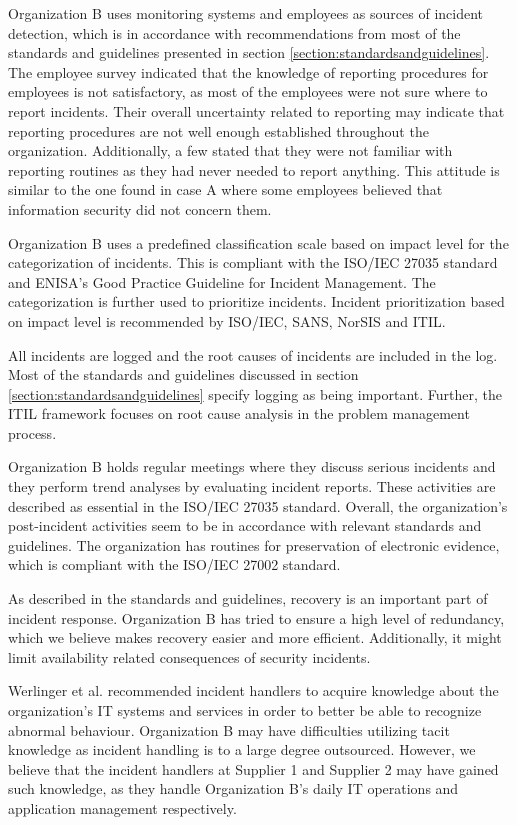 Organization B uses monitoring systems and employees as sources of incident detection, which is in accordance with recommendations from most of the standards and guidelines presented in section \ref{section:standardsandguidelines}. The employee survey indicated that the knowledge of reporting procedures for employees is not satisfactory, as most of the employees were not sure where to report incidents. Their overall uncertainty related to reporting may indicate that reporting procedures are not well enough established throughout the organization. Additionally, a few stated that they were not familiar with reporting routines as they had never needed to report anything. This attitude is similar to the one found in case A where some employees believed that information security did not concern them. 

Organization B uses a predefined classification scale based on impact level for the categorization of incidents. This is compliant with the ISO/IEC 27035 standard and ENISA's Good Practice Guideline for Incident Management. The categorization is further used to prioritize incidents. Incident prioritization based on impact level is recommended by ISO/IEC, SANS, NorSIS and ITIL.

All incidents are logged and the root causes of incidents are included in the log. Most of the standards and guidelines discussed in section \ref{section:standardsandguidelines} specify logging as being important. Further, the ITIL framework focuses on root cause analysis in the problem management process.

Organization B holds regular meetings where they discuss serious incidents and they perform trend analyses by evaluating incident reports. These activities are described as essential in the ISO/IEC 27035 standard. Overall, the organization's post-incident activities seem to be in accordance with relevant standards and guidelines. The organization has routines for preservation of electronic evidence, which is compliant with the ISO/IEC 27002 standard.

As described in the standards and guidelines, recovery is an important part of incident response. Organization B has tried to ensure a high level of redundancy, which we believe makes recovery easier and more efficient. Additionally, it might limit availability related consequences of security incidents. 

Werlinger et al. recommended incident handlers to acquire knowledge about the organization's IT systems and services in order to better be able to recognize abnormal behaviour\cite{werlinger2010preparation}. Organization B may have difficulties utilizing tacit knowledge as incident handling is to a large degree outsourced. However, we believe that the incident handlers at Supplier 1 and Supplier 2 may have gained such knowledge, as they handle Organization B's daily IT operations and application management respectively. 

